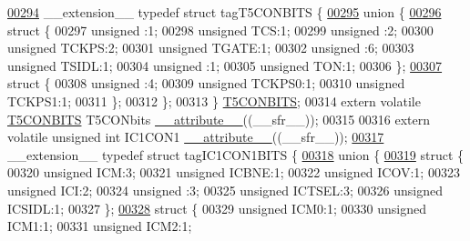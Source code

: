\begin{DoxyCode}
\hypertarget{a00015_source_l00294}{}\hyperlink{a00014}{00294} \_\_extension\_\_ \textcolor{keyword}{typedef} \textcolor{keyword}{struct }tagT5CONBITS \{
\hypertarget{a00015_source_l00295}{}\hyperlink{a00015}{00295}   \textcolor{keyword}{union }\{
\hypertarget{a00015_source_l00296}{}\hyperlink{a00015}{00296}     \textcolor{keyword}{struct }\{
00297       \textcolor{keywordtype}{unsigned} :1;
00298       \textcolor{keywordtype}{unsigned} TCS:1;
00299       \textcolor{keywordtype}{unsigned} :2;
00300       \textcolor{keywordtype}{unsigned} TCKPS:2;
00301       \textcolor{keywordtype}{unsigned} TGATE:1;
00302       \textcolor{keywordtype}{unsigned} :6;
00303       \textcolor{keywordtype}{unsigned} TSIDL:1;
00304       \textcolor{keywordtype}{unsigned} :1;
00305       \textcolor{keywordtype}{unsigned} TON:1;
00306     \};
\hypertarget{a00015_source_l00307}{}\hyperlink{a00015}{00307}     \textcolor{keyword}{struct }\{
00308       \textcolor{keywordtype}{unsigned} :4;
00309       \textcolor{keywordtype}{unsigned} TCKPS0:1;
00310       \textcolor{keywordtype}{unsigned} TCKPS1:1;
00311     \};
00312   \};
00313 \} \hyperlink{a00014_d0/dad/a00806}{T5CONBITS};
00314 \textcolor{keyword}{extern} \textcolor{keyword}{volatile} \hyperlink{a00014_d0/dad/a00806}{T5CONBITS} T5CONbits \hyperlink{a00015_a493c46f03454991ccc5aa7a6e1dfb2a7}{\_\_attribute\_\_}((\_\_sfr\_\_));
00315 
00316 \textcolor{keyword}{extern} \textcolor{keyword}{volatile} \textcolor{keywordtype}{unsigned} \textcolor{keywordtype}{int}  IC1CON1 \hyperlink{a00015_a493c46f03454991ccc5aa7a6e1dfb2a7}{\_\_attribute\_\_}((\_\_sfr\_\_));
\hypertarget{a00015_source_l00317}{}\hyperlink{a00014}{00317} \_\_extension\_\_ \textcolor{keyword}{typedef} \textcolor{keyword}{struct }tagIC1CON1BITS \{
\hypertarget{a00015_source_l00318}{}\hyperlink{a00015}{00318}   \textcolor{keyword}{union }\{
\hypertarget{a00015_source_l00319}{}\hyperlink{a00015}{00319}     \textcolor{keyword}{struct }\{
00320       \textcolor{keywordtype}{unsigned} ICM:3;
00321       \textcolor{keywordtype}{unsigned} ICBNE:1;
00322       \textcolor{keywordtype}{unsigned} ICOV:1;
00323       \textcolor{keywordtype}{unsigned} ICI:2;
00324       \textcolor{keywordtype}{unsigned} :3;
00325       \textcolor{keywordtype}{unsigned} ICTSEL:3;
00326       \textcolor{keywordtype}{unsigned} ICSIDL:1;
00327     \};
\hypertarget{a00015_source_l00328}{}\hyperlink{a00015}{00328}     \textcolor{keyword}{struct }\{
00329       \textcolor{keywordtype}{unsigned} ICM0:1;
00330       \textcolor{keywordtype}{unsigned} ICM1:1;
00331       \textcolor{keywordtype}{unsigned} ICM2:1;

\end{DoxyCode}
